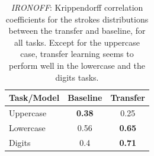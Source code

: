       \begin{table}[!htbp]
        \centering
        \begin{tabular}{l c c} \hline
        Task/Model & Baseline & Transfer \\ \hline
        Uppercase & \textbf{0.38} & 0.25 \\ %
        Lowercase & 0.56 & \textbf{0.65} \\ %
        Digits & 0.4  & \textbf{0.71} \\ \hline
        \end{tabular}
        \caption{\textit{IRONOFF}: Krippendorff correlation coefficients for the strokes distributions between the transfer and baseline, for all tasks. Except for the uppercase case, transfer learning seems to perform well in the lowercase and the digits tasks.}
        \label{table:ironoff_strokes_transfer}
      \end{table}

